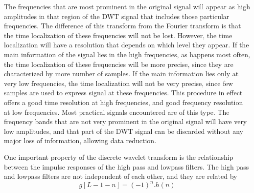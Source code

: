 \documentclass[12pt, a4paper, twoside]{report}
\begin{document}
The frequencies that are most prominent in the original signal will appear as high amplitudes in that region of the DWT signal that includes those particular frequencies. The difference of this transform from the Fourier transform is that the time localization of these frequencies will not be lost. However, the time localization will have a resolution that depends on which level they appear. If the main information of the signal lies in the high frequencies, as happens most often, the time localization of these frequencies will be more precise, since they are characterized by more number of samples. If the main information lies only at very low frequencies, the time localization will not be very precise, since few samples are used to express signal at these frequencies. This procedure in effect offers a good time resolution at high frequencies, and good frequency resolution at low frequencies. Most practical signals encountered are of this type. The frequency bands that are not very prominent in the original signal will have very low amplitudes, and that part of the DWT signal can be discarded without any major loss of information, allowing data reduction.
\par
One important property of the discrete wavelet transform is the relationship between the impulse responses of the high pass and lowpass filters. The high pass and lowpass filters are not independent of each other, and they are related by
\begin{equation}
g[L-1-n] = (-1)^n .h(n)
\end{equation}
\end{document}
